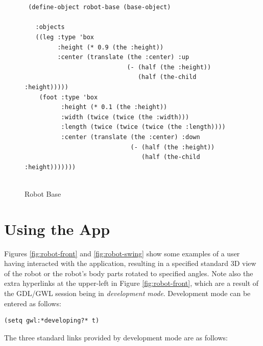 \documentclass [11pt]{book}
\begin{document}
\begin{figure}
\begin{lrbox}{\boxedverb}
\begin{minipage}{\linewidth}

\begin{verbatim}


 (define-object robot-base (base-object)

   :objects
   ((leg :type 'box
         :height (* 0.9 (the :height))
         :center (translate (the :center) :up
                            (- (half (the :height)) 
                               (half (the-child :height)))))
    (foot :type 'box
          :height (* 0.1 (the :height))
          :width (twice (twice (the :width)))
          :length (twice (twice (twice (the :length))))
          :center (translate (the :center) :down
                             (- (half (the :height)) 
                                (half (the-child :height)))))))      
      
\end{verbatim}
\end{minipage}
\end{lrbox}
\fbox{\usebox{\boxedverb}}

\caption{Robot Base}

\label{code:robot-base}

\end{figure}


\section{Using the App}

\label{sec:usingtheapp}

Figures 
\ref{fig:robot-front} and 
\ref{fig:robot-swing} show some examples of a user having interacted with the application, resulting in
a specified standard 3D view of the robot or the robot's body parts rotated to specified
angles. Note also the extra hyperlinks at the upper-left in Figure 
\ref{fig:robot-front}, which are a result of the GDL/GWL session being in \emph{development mode}. Development mode can be entered as follows:

\begin{verbatim}(setq gwl:*developing?* t)
\end{verbatim}The three standard links provided by development mode are as follows:
\end{document}
